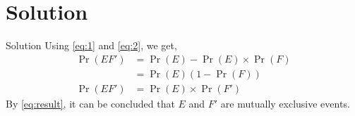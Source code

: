 \documentclass{beamer}
\providecommand{\pr}[1]{\ensuremath{\Pr\left(#1\right)}}
\providecommand{\brak}[1]{\ensuremath{\left(#1\right)}}
\begin{document}
\section{Solution}
\begin{frame}{Solution}
    Using \eqref{eq:1} and \eqref{eq:2}, we get,
    \begin{align}
        \pr{EF'} & = \pr{E} - \pr{E} \times \pr{F}
        \\
                 & = \pr{E}\brak{1 - \pr{F}}
        \\
        \label{eq:result}
        \pr{EF'} & = \pr{E} \times \pr{F'}
    \end{align}
    By \eqref{eq:result}, it can be concluded that $E$ and $F'$ are mutually exclusive events.
\end{frame}
\end{document}
